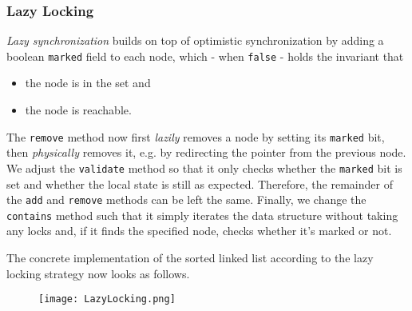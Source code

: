 \documentclass[main]{subfiles}
\begin{document}

\subsubsection{Lazy Locking}
\textit{Lazy synchronization} builds on top of optimistic synchronization by adding a boolean \texttt{marked} field to each node, which - when \texttt{false} - holds the invariant that
\begin{itemize}
    \item the node is in the set and
    \item the node is reachable.
\end{itemize}
The \texttt{remove} method now first \textit{lazily} removes a node by setting its \texttt{marked} bit, then \textit{physically} removes it, e.g. by redirecting the pointer from the previous node. We adjust the \texttt{validate} method so that it only checks whether the \texttt{marked} bit is set and whether the local state is still as expected. Therefore, the remainder of the \texttt{add} and \texttt{remove} methods can be left the same. Finally, we change the \texttt{contains} method such that it simply iterates the data structure without taking any locks and, if it finds the specified node, checks whether it's marked or not.

\newpage

\begin{example}
    The concrete implementation of the sorted linked list according to the lazy locking strategy now looks as follows.
    \begin{figure}[H]
        \centering
        \texttt{[image: LazyLocking.png]}
    \end{figure}
\end{example}

\newpage

\end{document}
